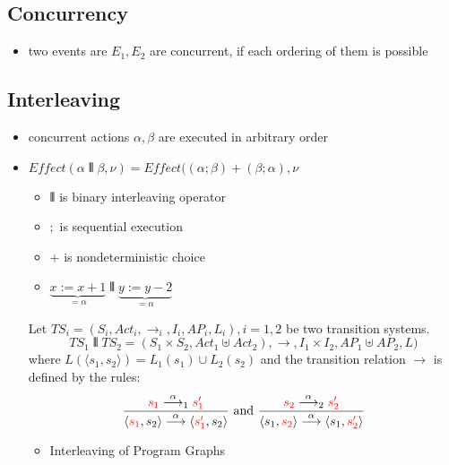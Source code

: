 \documentclass[a4paper, 10pt]{article}
\begin{document}
\subsection*{Concurrency}
\begin{itemize}
    \item two events are $E_1, E_2$ are concurrent, if each ordering of them is possible
\end{itemize}

\subsection*{Interleaving}
\begin{itemize}
    \item concurrent actions $\alpha,\beta$ are executed in arbitrary order
    \item $Effect(\alpha \interleave \beta,\nu) = Effect((\alpha;\beta)+(\beta;\alpha),\nu$
    \begin{itemize}
        \item $\interleave$  is binary interleaving operator
        \item $;$ is sequential execution
        \item $+$ is nondeterministic choice
        \item $\underset{=\alpha}{\underbrace{x:=x+1}} \interleave \underset{=\alpha}{\underbrace{y:=y-2}}$ \\
        \begin{center}
        \scalebox{.8}{}
        \end{center}
    \end{itemize}
    \begin{shaded}
        Let $TS_i=(S_i,Act_i,\to_i,I_i,AP_i,L_i), i=1,2$ be two transition systems.
        \[ TS_1\interleave TS_2 = (S_1\times S_2,Act_1\uplus Act_2),\to,I_1\times I_2,AP_1\uplus AP_2, L) \]
        where $L(\langle s_1,s_2\rangle)=L_1(s_1) \cup L_2(s_2)$ and the transition relation $\to$ is defined by the rules:
        \[
        \frac{\textcolor{red}{s_1}\overset{\alpha}{\longrightarrow}_1 \textcolor{red}{s'_1}}
        {\langle\textcolor{red}{s_1},s_2\rangle \overset{\alpha}{\longrightarrow} \langle\textcolor{red}{s'_1},s_2\rangle}
        \textrm{ and }
        \frac{\textcolor{red}{s_2}\overset{\alpha}{\longrightarrow}_2 \textcolor{red}{s'_2}}
        {\langle s_1,\textcolor{red}{s_2}\rangle \overset{\alpha}{\longrightarrow} \langle s_1,\textcolor{red}{s'_2}\rangle}
        \]
    \end{shaded}
    \begin{itemize}
        \item Interleaving of Program Graphs\\

\end{itemize}
\end{itemize}
\end{document}
